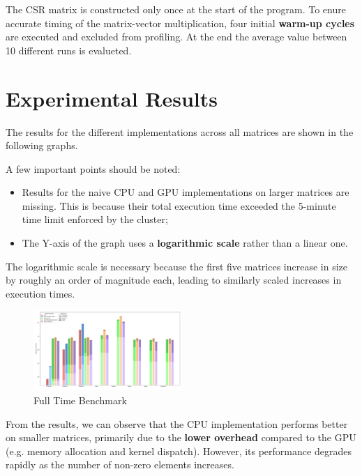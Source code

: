 \documentclass[conference]{IEEEtran}
\begin{document}
        The CSR matrix is constructed only once at the start of the program.
        To enure accurate timing of the matrix-vector multiplication, four
        initial \textbf{warm-up cycles} are executed and excluded from
        profiling.
        At the end the average value between 10 different runs is evalueted.

    \section{Experimental Results}

    The results for the different implementations across all matrices are shown
    in the following graphs.

    A few important points should be noted:
    \begin{itemize}
        \item Results for the naive CPU and GPU implementations on larger
            matrices are missing.
            This is because their total execution time exceeded the 5-minute
            time limit enforced by the cluster;
        \item The Y-axis of the graph uses a \textbf{logarithmic scale} rather
            than a linear one.
    \end{itemize}

    The logarithmic scale is necessary because the first five matrices increase
    in size by roughly an order of magnitude each, leading to similarly scaled
    increases in execution times.

    \begin{figure}[ht]
        \caption{Full Time Benchmark}
        \centering
        \includegraphics[width=0.5\textwidth]{full-benchmark.png}
    \end{figure}

    From the results, we can observe that the CPU implementation performs
    better on smaller matrices, primarily due to the \textbf{lower overhead}
    compared to the GPU (e.g. memory allocation and kernel dispatch).
    However, its performance degrades rapidly as the number of non-zero
    elements increases.
\end{document}
